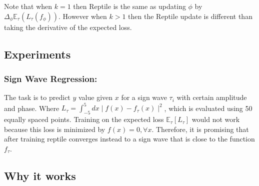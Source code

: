 Note that when $k = 1$ then Reptile is the same as updating $\phi$ by $\Delta_{\phi} \mathbb{E}_{\tau}(L_{\tau}(f_\phi))$.
However when $k > 1$ then the Reptile update is different than taking the derivative of the expected loss.

\subsection{Experiments}

\subsubsection{Sign Wave Regression:}

The task is to predict $y$ value given $x$ for a sign wave $\tau_i$ with certain amplitude and phase.
Where $L_{\tau} = \int_{-5}^{5} dx \mid f(x) - f_{\tau}(x) \mid^2$, which is evaluated using 50 equally spaced points.
Training on the expected loss $\mathbb{E}_\tau[L_\tau]$ would not work because this loss is minimized by $f(x) = 0, \forall x$.
Therefore, it is promising that after training reptile converges instead to a sign wave that is close to the function $f_{\tau}$.

\subsection{Why it works}
